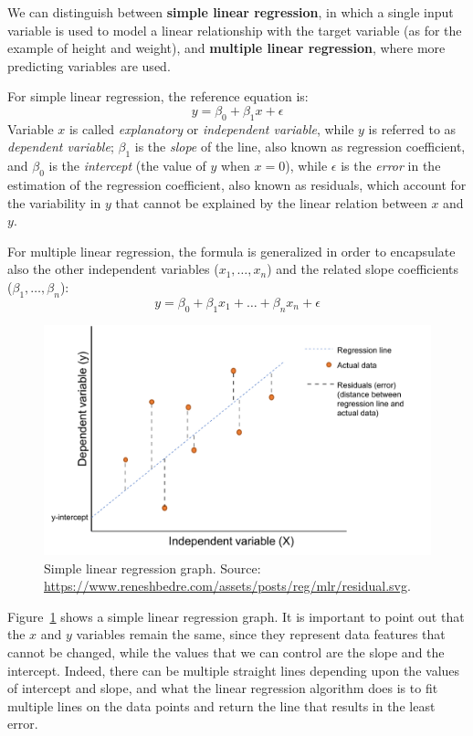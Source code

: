 We can distinguish between \textbf{simple linear regression}, in which a single input variable is used to model a linear relationship with the target variable (as for the example of height and weight), and \textbf{multiple linear regression}, where more predicting variables are used.

For simple linear regression, the reference equation is: \[y = \beta_0 + \beta_1x + \epsilon\]
Variable \(x\) is called \textit{explanatory} or \textit{independent variable}, while \(y\) is referred to as \textit{dependent variable}; \(\beta_1\) is the \textit{slope} of the line, also known as regression coefficient, and \(\beta_0\) is the \textit{intercept} (the value of \(y\) when \(x = 0\)), while \(\epsilon\) is the \textit{error} in the estimation of the regression coefficient, also known as residuals, which account for the variability in \(y\) that cannot be explained by the linear relation between \(x\) and \(y\).

For multiple linear regression, the formula is generalized in order to encapsulate also the other independent variables (\(x_1, \ldots, x_n\)) and the related slope coefficients (\(\beta_1, \ldots, \beta_n\)): \[y = \beta_0 + \beta_1x_1 + \ldots + \beta_nx_n + \epsilon\]

\begin{figure}[t!]
\includegraphics[scale=.7]{figures/simple_linear_regression.pdf}
\centering
\caption{Simple linear regression graph.\newline
Source: \upshape\protect\url{https://www.reneshbedre.com/assets/posts/reg/mlr/residual.svg}.}
\label{fig:simple_linear_regression}
\end{figure}

Figure~\ref{fig:simple_linear_regression} shows a simple linear regression graph. It is important to point out that the \(x\) and \(y\) variables remain the same, since they represent data features that cannot be changed, while the values that we can control are the slope and the intercept. Indeed, there can be multiple straight lines depending upon the values of intercept and slope, and what the linear regression algorithm does is to fit multiple lines on the data points and return the line that results in the least error.

